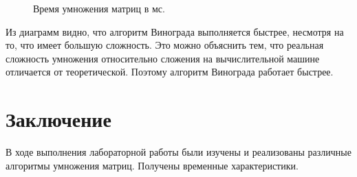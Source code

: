 \documentclass[a4paper,12pt]{article}
\begin{document}
\begin{figure}[H]
	\noindent{}
	\caption{Время умножения матриц в мс.}
\end{figure}

Из диаграмм видно, что алгоритм Винограда выполняется быстрее, несмотря на то, что имеет большую сложность. Это можно объяснить тем, что реальная сложность умножения относительно сложения на вычислительной машине отличается от теоретической. Поэтому алгоритм Винограда работает быстрее.

\section{Заключение}
	В ходе выполнения лабораторной работы были изучены и реализованы различные алгоритмы умножения матриц. Получены временные характеристики.
\end{document}
